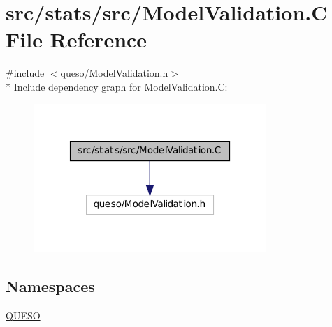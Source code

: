 \hypertarget{_model_validation_8_c}{\section{src/stats/src/\-Model\-Validation.C File Reference}
\label{_model_validation_8_c}
}
{\ttfamily \#include $<$queso/\-Model\-Validation.\-h$>$}\\*
Include dependency graph for Model\-Validation.\-C\-:
\nopagebreak
\begin{figure}[H]
\begin{center}
\leavevmode
\includegraphics[width=250pt]{_model_validation_8_c__incl}
\end{center}
\end{figure}
\subsection*{Namespaces}
\begin{DoxyCompactItemize}
\item 
\hyperlink{namespace_q_u_e_s_o}{Q\-U\-E\-S\-O}
\end{DoxyCompactItemize}
